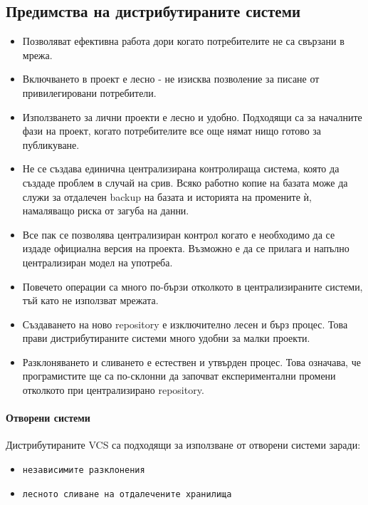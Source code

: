 \documentclass[a4paper]{article}
\begin{document}
  \subsection{Предимства на дистрибутираните системи}
    \begin{itemize}
      \item Позволяват ефективна работа дори когато потребителите не са
      свързани в мрежа.
      \item Включването в проект е лесно - не изисква позволение за писане от
      привилегировани потребители.
      \item Използването за лични проекти е лесно и удобно. Подходящи са за
      началните фази на проект, когато потребителите все още нямат нищо готово
      за публикуване.
      \item Не се създава единична централизирана контролираща система, която
      да създаде проблем в случай на срив. Всяко работно копие на базата може
      да служи за отдалечен backup на базата и историята на промените ѝ,
      намаляващо риска от загуба на данни.
      \item Все пак се позволява централизиран контрол когато е необходимо да
      се издаде официална версия на проекта. Възможно е да се прилага и напълно
      централизиран модел на употреба.
      \item Повечето операции са много по-бързи отколкото в централизираните
      системи, тъй като не използват мрежата.
      \item Създаването на ново repository е изключително лесен и бърз процес.
      Това прави дистрибутираните системи много удобни за малки проекти.
      \item Разклоняването и сливането е естествен и утвърден процес. Това
      означава, че програмистите ще са по-склонни да започват експериментални
      промени отколкото при централизирано repository.
    \end{itemize}

    \paragraph{Отворени системи}
      Дистрибутираните VCS са подходящи за използване от отворени системи заради:
      \begin{itemize}
        \item \texttt{независимите разклонения}
        \item \texttt{лесното сливане на отдалечените хранилища}
      \end{itemize}
\end{document}
